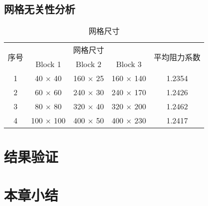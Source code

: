 \subsection{网格无关性分析}

\begin{table}
	\caption{网格尺寸}\label{tab: grid}
	\vspace{.5em}\centering\wuhao
	\begin{tabular}{ccccc}
		\toprule[1.5pt]
		\multirow{2}[3]{*}{序号} & \multicolumn{3}{c}{网格尺寸} & \multirow{2}[3]{*}{平均阻力系数} \\
		\cmidrule[.67pt](lr){2-4}
		& Block 1 & Block 2 & Block 3 & \\
		\midrule[1pt]
		1 & 40 $\times$ 40 & 160 $\times$ 25 & 160 $\times$ 140 & 1.2354 \\
		2 & 60 $\times$ 60 & 240 $\times$ 30 & 240 $\times$ 170 & 1.2426 \\
		3 & 80 $\times$ 80 & 320 $\times$ 40 & 320 $\times$ 200 & 1.2462 \\
		4 & 100 $\times$ 100 & 400 $\times$ 50 & 400 $\times$ 230 & 1.2417 \\
		\bottomrule[1.5pt]
	\end{tabular}
\end{table}

\section{结果验证}

\section{本章小结}
